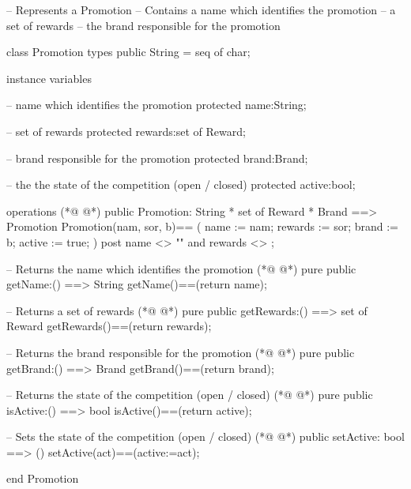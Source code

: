 \begin{vdmpp}[breaklines=true]
-- Represents a Promotion
-- Contains a name which identifies the promotion
--      a set of rewards
--          the brand responsible for the promotion

class Promotion
 types
    public String = seq of char;

 instance variables
 
  -- name which identifies the promotion
  protected name:String; 
  
  -- set of rewards
   protected rewards:set of Reward;
   
   -- brand responsible for the promotion
   protected brand:Brand;
   
   -- the the state of the competition (open / closed)
  protected active:bool;

 operations
(*@
\label{Promotion:25}
@*)
  public Promotion: String * set of Reward * Brand ==> Promotion
  Promotion(nam, sor, b)== 
  (
    name := nam;
    rewards := sor;
    brand := b;
    active := true;
  )
  post name <> "" and rewards <> {};
  
  -- Returns the name which identifies the promotion
(*@
\label{getName:36}
@*)
  pure public getName:() ==> String
     getName()==(return name);
     
   -- Returns a set of rewards 
(*@
\label{getRewards:40}
@*)
   pure public getRewards:() ==> set of Reward
    getRewards()==(return rewards);
  
  -- Returns the brand responsible for the promotion 
(*@
\label{getBrand:44}
@*)
   pure public getBrand:() ==> Brand
    getBrand()==(return brand); 
     
  -- Returns the state of the competition (open / closed)
(*@
\label{isActive:48}
@*)
  pure public isActive:() ==> bool
    isActive()==(return active);
    
   -- Sets the state of the competition (open / closed)
(*@
\label{setActive:52}
@*)
   public setActive: bool ==> ()
   setActive(act)==(active:=act);

end Promotion
\end{vdmpp}
